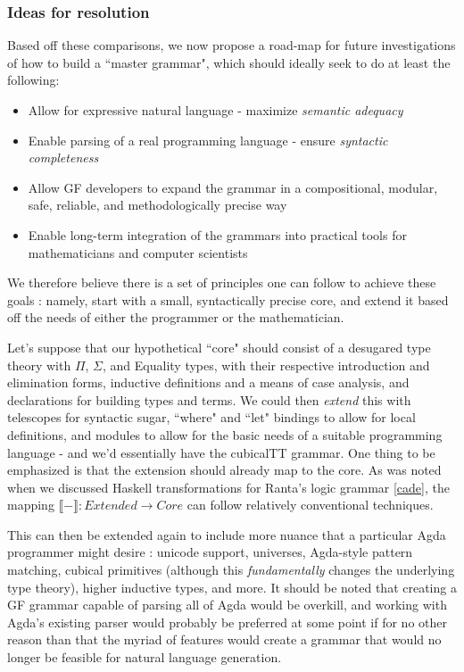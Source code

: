 \subsubsection{Ideas for resolution}

Based off these comparisons, we now propose a road-map for future investigations
of how to build a ``master grammar", which should ideally seek to do at least
the following:

\begin{itemize}
\item Allow for expressive natural language - maximize \emph{semantic adequacy}
\item Enable parsing of a real programming language - ensure \emph{syntactic completeness}
\item Allow GF developers to expand the grammar in a compositional, modular, safe, reliable,
  and methodologically precise way
\item Enable long-term integration of the grammars into practical tools for
  mathematicians and computer scientists
\end{itemize}

We therefore believe there is a set of principles one can follow to achieve
these goals : namely, start with a small, syntactically precise core, and extend
it based off the needs of either the programmer or the mathematician.

Let's suppose that our hypothetical ``core" should consist of a desugared type
theory with $\Pi$, $\Sigma$, and Equality types, with their respective
introduction and elimination forms, inductive definitions and a means of case
analysis, and declarations for building types and terms. We could then
\emph{extend} this with telescopes for syntactic sugar, ``where" and ``let"
bindings to allow for local definitions, and modules to allow for the basic
needs of a suitable programming language - and we'd essentially have the
cubicalTT grammar. One thing to be emphasized is that the extension should
already map to the core. As was noted when we discussed Haskell transformations
for Ranta's logic grammar \ref{cade}, the mapping $\llbracket - \rrbracket :
Extended \to Core$ can follow relatively conventional techniques.

This can then be extended again to include more nuance that a particular Agda programmer
might desire : unicode support, universes, Agda-style pattern matching, cubical
primitives (although this \emph{fundamentally} changes the underlying type
theory), higher inductive types, and more. It should be noted that creating a GF
grammar capable of parsing all of Agda would be overkill, and working with
Agda's existing parser would probably be preferred at some point if for no other
reason than that the myriad of features would create a grammar that would no
longer be feasible for natural language generation.

